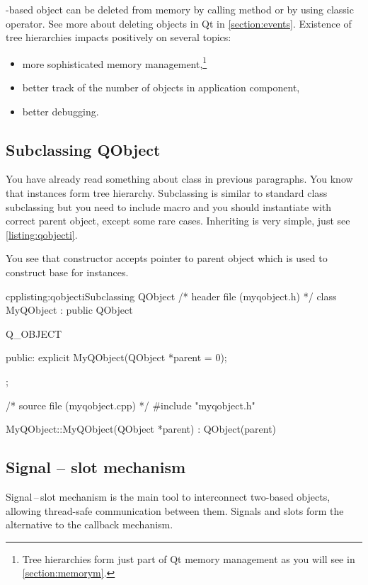 \indent{}-based object can be deleted from memory by calling method or by using classic operator. See more about deleting objects in Qt in \autoref{section:events}. Existence of tree hierarchies impacts positively on several topics:
\begin{itemize}
\item more sophisticated memory management,\footnote{Tree hierarchies form just part of Qt memory management as you will see in \autoref{section:memorym}.}
\item better track of the number of objects in application component,
\item better debugging.
\end{itemize}

\subsection{Subclassing QObject}
You have already read something about class in previous paragraphs. You know that instances form tree hierarchy. Subclassing is similar to standard \cpp{} class subclassing but you need to include macro and you should instantiate with correct parent object, except some rare cases. Inheriting is very simple, just see \autoref{listing:qobjecti}.

You see that constructor accepts pointer to parent object which is used to construct base for instances.

\begin{fdoccode}{cpp}{listing:qobjecti}{Subclassing QObject}
/* header file (myqobject.h) */
class MyQObject : public QObject {
	Q_OBJECT
	
    public:
		explicit MyQObject(QObject *parent = 0);
};

/* source file (myqobject.cpp) */
#include "myqobject.h"


MyQObject::MyQObject(QObject *parent) : QObject(parent) {
}
\end{fdoccode}

\subsection{Signal -- slot mechanism}
Signal\,--\,slot mechanism is the main tool to interconnect two-based objects, allowing thread-safe communication between them. Signals and slots form the alternative to the callback mechanism. 

